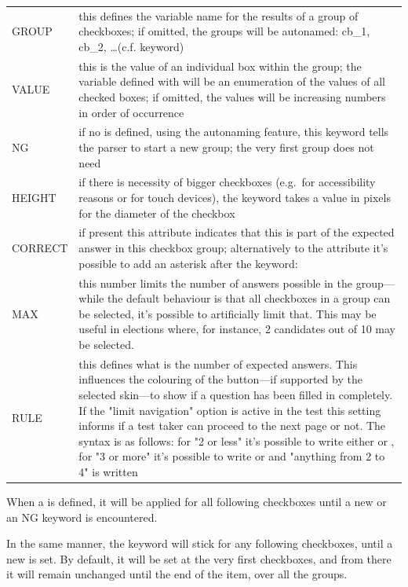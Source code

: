 \documentclass[12pt]{article} %
\newenvironment{keyword}{\leavevmode\color{magenta}}{}
\newenvironment{properties}
	{
    	\footnotesize\renewcommand{\arraystretch}{1.30}
  		\renewcommand{\tabcolsep}{0pt}
   		\begin{longtable}{>{\begin{keyword}}p{3.1cm}<{\end{keyword}}p{13.9cm}}
    	\hline
	}
	{
		\hline\end{longtable}\vspace{5mm}
	}
\begin{document}
\begin{properties}
\hline
GROUP & this defines the variable name for the results of a group of checkboxes;
if omitted, the groups will be autonamed: cb\_1, cb\_2, \ldots (c.f. \kw{NG} keyword) \\
VALUE & this is the value of an individual box within the group;
the variable defined with \kw{GROUP} will be an enumeration of the values of all checked boxes;
if omitted, the values will be increasing numbers in order of occurrence \\
NG & if no \kw{GROUP} is defined, using the autonaming feature, this keyword tells the parser to start a new group;
the very first group does not need \kw{NG}\\
HEIGHT & if there is necessity of bigger checkboxes (e.g.\ for accessibility reasons or for touch devices), the \kw{HEIGHT} keyword takes a value in pixels for the diameter of the checkbox \\
CORRECT & if present this attribute indicates that this is part of the expected answer in this checkbox group;
alternatively to the \kw{CORRECT} attribute it's possible to add an asterisk after the keyword: \kw{[@CB* ... @]} \\
MAX & this number limits the number of answers possible in the group—while the default behaviour is that all checkboxes in a group can be selected, it's possible to artificially limit that.
This may be useful in elections where, for instance, 2 candidates out of 10 may be selected. \\
RULE & this defines what is the number of expected answers.
This influences the colouring of the button—if supported by the selected skin—to show if a question has been filled in completely.
If the "limit navigation" option is active in the test this setting informs if a test taker can proceed to the next page or not.
The syntax is as follows: for "2 or less" it's possible to write either \kw{<3} or \kw{2-}, for "3 or more" it's possible to write \kw{>2} or \kw{3+} and "anything from 2 to 4" is written \kw{2..4} \\
\hline
\end{properties}
\vspace{0.1cm}

When a  is defined, it will be applied for all following checkboxes until a new  or an NG keyword is encountered.

In the same manner, the  keyword will stick for any following checkboxes, until a new  is set.
By default, it will be set at the very first checkboxes, and from there it will remain unchanged until the end of the item, over all the groups.
\end{document}
